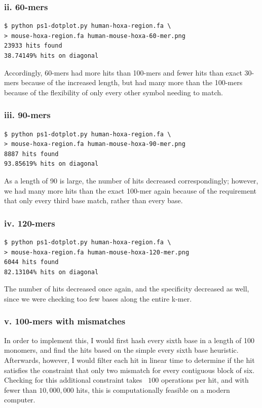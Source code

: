 \documentclass[a4paper]{article}
\begin{document}
\subsubsection*{ii. 60-mers}
\begin{verbatim}
$ python ps1-dotplot.py human-hoxa-region.fa \
> mouse-hoxa-region.fa human-mouse-hoxa-60-mer.png
23933 hits found
38.74149% hits on diagonal
\end{verbatim}
Accordingly, 60-mers had more hits than 100-mers and
fewer hits than exact 30-mers because of the increased
length, but had many more than the 100-mers because of
the flexibility of only every other symbol needing to
match.

\subsubsection*{iii. 90-mers}
\begin{verbatim}
$ python ps1-dotplot.py human-hoxa-region.fa \
> mouse-hoxa-region.fa human-mouse-hoxa-90-mer.png
8887 hits found
93.85619% hits on diagonal
\end{verbatim}
As a length of 90 is large, the number of hits decreased
correspondingly; however, we had many more hits than the
exact 100-mer again because of the requirement that only
every third base match, rather than every base.

\subsubsection*{iv. 120-mers}
\begin{verbatim}
$ python ps1-dotplot.py human-hoxa-region.fa \
> mouse-hoxa-region.fa human-mouse-hoxa-120-mer.png
6044 hits found
82.13104% hits on diagonal
\end{verbatim}
The number of hits decreased once again, and the specificity
decreased as well, since we were checking too few bases along
the entire k-mer.

\subsubsection*{v. 100-mers with mismatches}
In order to implement this, I would first hash every sixth
base in a length of 100 monomers, and find the hits 
based on the simple every sixth base heuristic. Afterwards,
however, I would filter each hit in linear time to determine
if the hit satisfies the constraint that only two mismatch
for every contiguous block of six. Checking for this
additional constraint takes ~$100$ operations per hit,
and with fewer than $10,000,000$ hits, this is computationally
feasible on a modern computer.
\end{document}
